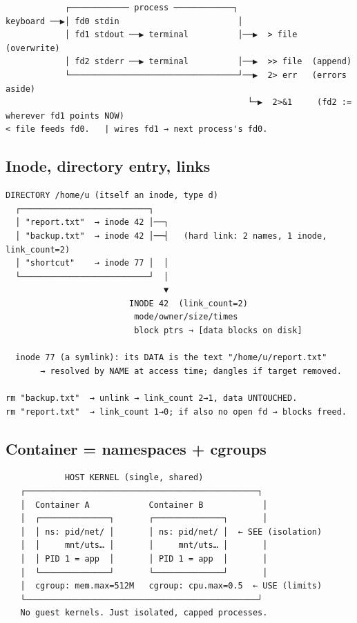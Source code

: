 \documentclass[11pt]{article}
\begin{document}
\setcodelang{}

\begin{verbatim}
            ┌──────────── process ────────────┐
keyboard ──▶│ fd0 stdin                        │
            │ fd1 stdout ──▶ terminal          │──▶  > file   (overwrite)
            │ fd2 stderr ──▶ terminal          │──▶  >> file  (append)
            └──────────────────────────────────┘──▶  2> err   (errors aside)
                                                 └─▶  2>&1     (fd2 := wherever fd1 points NOW)
< file feeds fd0.   | wires fd1 → next process's fd0.
\end{verbatim}

\subsection{Inode, directory entry, links}\label{inode-directory-entry-links}

\setcodelang{}

\begin{verbatim}
DIRECTORY /home/u (itself an inode, type d)
  ┌──────────────────────────┐
  │ "report.txt"  → inode 42 │──┐
  │ "backup.txt"  → inode 42 │──┤   (hard link: 2 names, 1 inode, link_count=2)
  │ "shortcut"    → inode 77 │  │
  └──────────────────────────┘  │
                                ▼
                         INODE 42  (link_count=2)
                          mode/owner/size/times
                          block ptrs → [data blocks on disk]

  inode 77 (a symlink): its DATA is the text "/home/u/report.txt"
       → resolved by NAME at access time; dangles if target removed.

rm "backup.txt"  → unlink → link_count 2→1, data UNTOUCHED.
rm "report.txt"  → link_count 1→0; if also no open fd → blocks freed.
\end{verbatim}

\subsection{Container = namespaces + cgroups}\label{container--namespaces--cgroups}

\setcodelang{}

\begin{verbatim}
            HOST KERNEL (single, shared)
   ┌───────────────────────────────────────────────┐
   │  Container A            Container B            │
   │  ┌──────────────┐       ┌──────────────┐       │
   │  │ ns: pid/net/ │       │ ns: pid/net/ │  ← SEE (isolation)
   │  │     mnt/uts… │       │     mnt/uts… │       │
   │  │ PID 1 = app  │       │ PID 1 = app  │       │
   │  └──────────────┘       └──────────────┘       │
   │  cgroup: mem.max=512M   cgroup: cpu.max=0.5  ← USE (limits)
   └───────────────────────────────────────────────┘
   No guest kernels. Just isolated, capped processes.
\end{verbatim}
\end{document}
